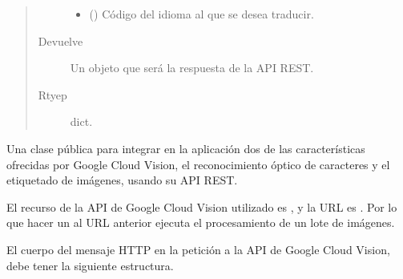 \begin{fulllineitems}
\begin{fulllineitems}
\begin{fulllineitems}
\begin{quote}
\begin{description}
\begin{itemize}
\item {} 
 () \textendash{} Código del idioma al que se desea traducir.

\end{itemize}

\item[{Devuelve}] \leavevmode
Un objeto que será la respuesta de la API REST.

\item[{Rtyep}] \leavevmode
dict.

\end{description}\end{quote}

\end{fulllineitems}


\end{fulllineitems}

\label{\detokenize{chapter_two/desc_cloudnao:module-app.tpa_client_libraries.google_cloud_vision}}\label{\detokenize{chapter_two/desc_cloudnao:module-google_cloud_vision}}

\begin{fulllineitems}
\label{\detokenize{chapter_two/desc_cloudnao:app.tpa_client_libraries.google_cloud_vision.GoogleCloudVision}}
Una clase pública para integrar en la aplicación dos de las características
ofrecidas por Google Cloud Vision, el reconocimiento óptico de caracteres y
el etiquetado de imágenes, usando su API REST.

El recurso de la API de Google Cloud Vision utilizado es ,
y la URL es
. Por lo que hacer
un  al URL anterior ejecuta el procesamiento de un lote de imágenes.

El cuerpo del mensaje HTTP en la petición a la API de Google Cloud Vision,
debe tener la siguiente estructura.


\end{fulllineitems}
\end{fulllineitems}
